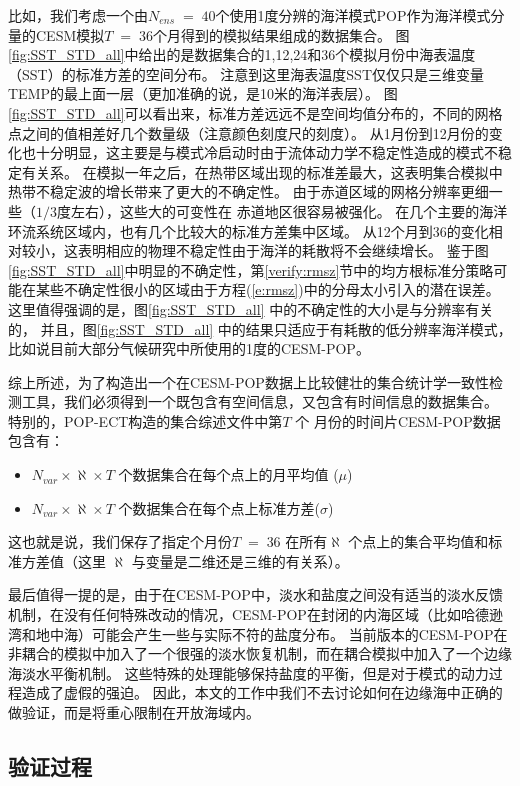 比如，我们考虑一个由$N_{ens} \;=\; 40$个使用1度分辨的海洋模式POP作为海洋模式分量的CESM模拟$T\;=\;36$个月得到的模拟结果组成的数据集合。 
图 \ref{fig:SST_STD_all}中给出的是数据集合的1,12,24和36个模拟月份中海表温度（SST）的标准方差的空间分布。
注意到这里海表温度SST仅仅只是三维变量TEMP的最上面一层（更加准确的说，是10米的海洋表层）。
图 \ref{fig:SST_STD_all}可以看出来，标准方差远远不是空间均值分布的，不同的网格点之间的值相差好几个数量级（注意颜色刻度尺的刻度）。 
从1月份到12月份的变化也十分明显，这主要是与模式冷启动时由于流体动力学不稳定性造成的模式不稳定有关系。  
在模拟一年之后，在热带区域出现的标准差最大，这表明集合模拟中热带不稳定波的增长带来了更大的不确定性\cite{legeckis1977}。
由于赤道区域的网格分辨率更细一些（$1/3$度左右），这些大的可变性在 赤道地区很容易被强化。 
在几个主要的海洋环流系统区域内，也有几个比较大的标准方差集中区域。
从12个月到36的变化相对较小，这表明相应的物理不稳定性由于海洋的耗散将不会继续增长。
鉴于图 \ref{fig:SST_STD_all}中明显的不确定性，第\ref{verify:rmsz}节中的均方根标准分策略可能在某些不确定性很小的区域由于方程(\ref{e:rmsz})中的分母太小引入的潜在误差。
这里值得强调的是，图\ref{fig:SST_STD_all} 中的不确定性的大小是与分辨率有关的，
并且，图\ref{fig:SST_STD_all} 中的结果只适应于有耗散的低分辨率海洋模式，比如说目前大部分气候研究中所使用的1度的CESM-POP。

 
综上所述，为了构造出一个在CESM-POP数据上比较健壮的集合统计学一致性检测工具，我们必须得到一个既包含有空间信息，又包含有时间信息的数据集合。
特别的，POP-ECT构造的集合综述文件中第$T$ 个 月份的时间片CESM-POP数据包含有：
\begin{itemize}
 \item $N_{var} \times \aleph \times T$ 个数据集合在每个点上的月平均值 ($\mu$)
 \item $N_{var} \times \aleph \times T$ 个数据集合在每个点上标准方差($\sigma$)
 \end{itemize}
 这也就是说，我们保存了指定个月份$T \;=\; 36$ 在所有$\aleph$ 个点上的集合平均值和标准方差值（这里 $\aleph$ 与变量是二维还是三维的有关系）。
 

最后值得一提的是，由于在CESM-POP中，淡水和盐度之间没有适当的淡水反馈机制，在没有任何特殊改动的情况，CESM-POP在封闭的内海区域（比如哈德逊湾和地中海）可能会产生一些与实际不符的盐度分布。
当前版本的CESM-POP在非耦合的模拟中加入了一个很强的淡水恢复机制，而在耦合模拟中加入了一个边缘海淡水平衡机制。
这些特殊的处理能够保持盐度的平衡，但是对于模式的动力过程造成了虚假的强迫。
因此，本文的工作中我们不去讨论如何在边缘海中正确的做验证，而是将重心限制在开放海域内。

\subsection{验证过程}
\label{verify:ECTprocess}
 
